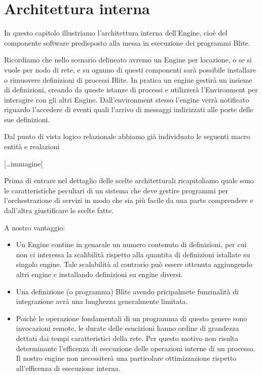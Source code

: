 \chapter{Architettura interna}

In questo capitolo illustriamo l'architettura interna dell'Engine, cioè del
componente software predisposto alla messa in esecuzione dei programmi Blite.

Ricordiamo che nello scenario delineato avremo un Engine per locazione, o se si
vuole per nodo di rete, e su ognuno di questi componenti sarà possibile
installare o rimuovere definizioni di processi Blite. In pratica un engine
gestir\`a un insieme di definizioni, creando da queste istanze di
processi e utilizzerà l'Environment per interagire con gli altri Engine. 
Dall'environment stesso l'engine verr\`a notificato riguardo l'accedere di
eventi quali l'arrivo di messaggi indirizzati alle porte delle sue definizioni.

Dal punto di vista logico relazionale abbiamo gi\`a individuato le seguenti
macro entit\`a e realazioni

[\ldots immagine]

Prima di entrare nel dettaglio delle scelte architetturali ricapitoliamo quale
sono le caratteristiche peculiari di un sistema che deve gestire programmi per
l'orchestrazione di servizi in modo che sia pi\`u facile da una parte
comprendere e dall'altra giustificare le scelte fatte.

A nostro vantaggio:
\begin{itemize}
  \item Un Engine contine in genarale un numero contenuto di definizioni, per
  cui non ci interessa la scalibilit\`a rispetto alla quantita di definizioni
  istallate su singolo engine. Tale scalabilit\`a al contrario pu\`o essere
  ottenuta aggiungendo altri engine e installando definizioni su engine diversi.
  
  \item  Una definizione (o programma) Blite avendo pricipalmete funzinalit\`a
  di integrazione avr\`a una lunghezza generalmente limitata. 
  
  \item Poich\`e le operazione fondamentali di un programma di questo genere
  sono invocazioni remote, le durate delle esucizioni hanno ordine di grandezza
  dettati dai tempi caratteristici della rete. Per questo motivo non risulta
  determinante l'efficenza di esecuzione delle operazioni interne di un
  processo. Il nostro engine non necessiter\`a una particolare ottimizzazione 
  rispetto all'efficenza di esecuzione interna.
\end{itemize}

